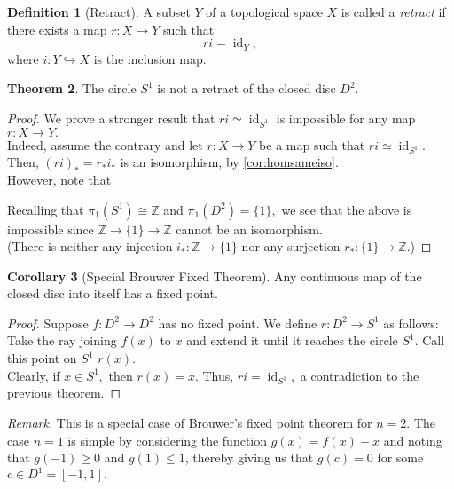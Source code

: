 \documentclass[12pt]{article}
\theoremstyle{definition}
\newtheorem{thm}{Theorem}
\numberwithin{thm}{section}
\newtheorem{defn}[thm]{Definition}
\newtheorem{cor}[thm]{Corollary}
\newcommand{\id}{\operatorname{id}}
\begin{document}
\begin{defn}[Retract]
	A subset $Y$ of a topological space $X$ is called a \emph{retract} if there exists a map $r:X \to Y$ such that
	\begin{equation*} 
		ri = \id_Y,
	\end{equation*}
	where $i:Y \hookrightarrow X$ is the inclusion map.
\end{defn}
\begin{thm}
	The circle $S^1$ is not a retract of the closed disc $D^2.$
\end{thm}
\begin{proof} 
	We prove a stronger result that $ri \simeq \id_{S^1}$ is impossible for any map $r:X \to Y.$\\
	Indeed, assume the contrary and let $r:X \to Y$ be a map such that $ri \simeq \id_{S^1}.$ Then, $(ri)_* = r_*i_*$ is an isomorphism, by \cref{cor:homsameiso}.\\
	However, note that 
	\begin{center}
	\end{center}
	Recalling that $\pi_1(S^1) \cong \mathbb{Z}$ and $\pi_1(D^2) = \{1\},$ we see that the above is impossible since $\mathbb{Z} \to \{1\} \to \mathbb{Z}$ cannot be an isomorphism. \\
	(There is neither any injection $i_* : \mathbb{Z} \to \{1\}$ nor any surjection $r_* : \{1\} \to \mathbb{Z}.$)
\end{proof}
\begin{cor}[Special Brouwer Fixed Theorem]
	Any continuous map of the closed disc into itself has a fixed point.
\end{cor}
\begin{proof} 
	Suppose $f:D^2 \to D^2$ has no fixed point. We define $r:D^2 \to S^1$ as follows:\\
	Take the ray joining $f(x)$ to $x$ and extend it until it reaches the circle $S^1.$ Call this point on $S^1$ $r(x).$\\
	Clearly, if $x \in S^1,$ then $r(x) = x.$ Thus, $ri = \id_{S^1},$ a contradiction to the previous theorem.
\end{proof}
\emph{Remark.} This is a special case of Brouwer's fixed point theorem for $n = 2.$ The case $n = 1$ is simple by considering the function $g(x) = f(x) - x$ and noting that $g(-1) \ge 0$ and $g(1) \le 1$, thereby giving us that $g(c) = 0$ for some $c \in D^1 = [-1, 1].$\\~\\
\end{document}
